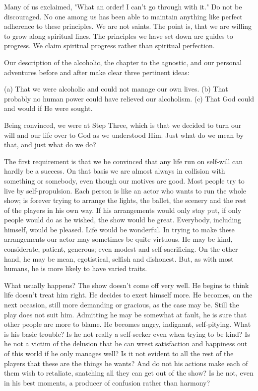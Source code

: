 \begin{biblechapter}
Many of us exclaimed, "What an order! I can't go through with it."  Do not be discouraged.  No one among us has been able to maintain anything like perfect adherence to these principles.  We are not saints.  The point is, that we are willing to grow along spiritual lines.  The principles we have set down are guides to progress.  We claim spiritual progress rather than spiritual perfection.

Our description of the alcoholic, the chapter to the agnostic, and our personal adventures before and after make clear three pertinent ideas:

(a) That we were alcoholic and could not manage our own lives.
(b) That probably no human power could have relieved our alcoholism.
(c) That God could and would if He were sought.

Being convinced, we were at Step Three, which is that we decided to turn our will and our life over to God as we understood Him.  Just what do we mean by that, and just what do we do?

The first requirement is that we be convinced that any life run on self-will can hardly be a success.  On that basis we are almost always in collision with something or somebody, even though our motives are good.  Most people try to live by self-propulsion.  Each person is like an actor who wants to run the whole show; is forever trying to arrange the lights, the ballet, the scenery and the rest of the players in his own way.  If his arrangements would only stay put, if only people would do as he wished, the show would be great.  Everybody, including himself, would be pleased. Life would be wonderful.  In trying to make these arrangements our actor may sometimes be quite virtuous.  He may be kind, considerate, patient, generous; even modest and self-sacrificing.  On the other hand, he may be mean, egotistical, selfish and dishonest.  But, as with most humans, he is more likely to have varied traits.

What usually happens?  The show doesn't come off very well.  He begins to think life doesn't treat him right.  He decides to exert himself more.  He becomes, on the next occasion, still more demanding or gracious, as the case may be.  Still the play does not suit him.  Admitting he may be somewhat at fault, he is sure that other people are more to blame. He becomes angry, indignant, self-pitying.  What is his basic trouble?  Is he not really a self-seeker even when trying to be kind?  Is he not a victim of the delusion that he can wrest satisfaction and happiness out of this world if he only manages well?  Is it not evident to all the rest of the players that these are the things he wants?  And do not his actions make each of them wish to retaliate, snatching all they can get out of the show?  Is he not, even in his best moments, a producer of confusion rather than harmony?


\end{biblechapter}

